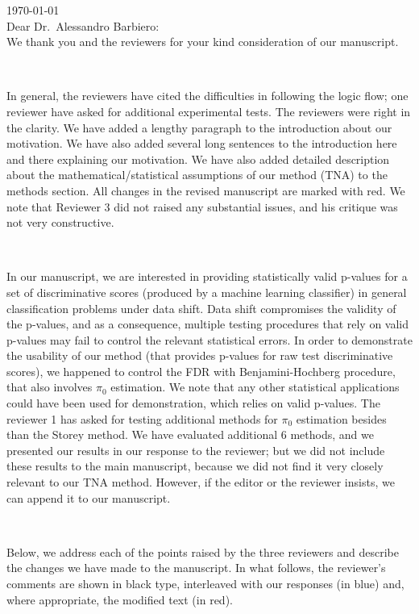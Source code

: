 \documentclass{article}
\begin{document}
	
\noindent
\today\\[2ex]

\noindent
Dear Dr.\ Alessandro Barbiero:\\[2ex]

We thank you and the reviewers for your kind consideration of our manuscript.

\ 

In general, the reviewers have cited the difficulties in following the logic flow; one reviewer have asked for additional experimental tests. The reviewers were right in the clarity. We have added a lengthy paragraph to the introduction about our motivation. We have also added several long sentences to the introduction here and there explaining our motivation. We have also added detailed description about the mathematical/statistical assumptions of our method (TNA) to the methods section. All changes in the revised manuscript are marked with red. We note that Reviewer 3 did not raised any substantial issues, and his critique was not very constructive. 

 \ 
 
In our manuscript, we are interested in providing statistically valid p-values for a set of discriminative scores (produced by a machine learning classifier) in general classification problems under data shift. Data shift compromises the validity of the p-values, and as a consequence, multiple testing procedures that rely on valid p-values may fail to control the relevant statistical errors. In order to demonstrate the usability of our method (that provides p-values for raw test discriminative scores), we happened to control the FDR with Benjamini-Hochberg procedure, that also involves $\pi_0$ estimation. We note that any other statistical applications could have been used  for demonstration, which relies on valid p-values. The reviewer 1 has asked for testing additional methods for $\pi_0$ estimation besides than the Storey method. We have evaluated additional 6 methods, and we presented our results in our response to the reviewer; but we did not include these results to the main manuscript, because we did not find it very closely relevant to our TNA method. However, if the editor or the reviewer insists, we can append it to our manuscript.

\ 

Below, we address each of the points raised by the three reviewers and describe the changes we have made to the manuscript.
In what follows, the reviewer's comments are shown in black type, interleaved with our responses (in blue) and, where appropriate, the modified text (in red).
\end{document}
